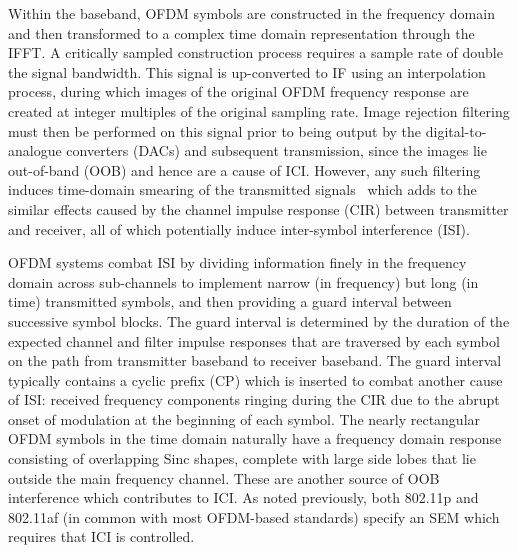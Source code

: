 Within the baseband, OFDM symbols are constructed in the frequency domain and then transformed to a complex time domain representation through the IFFT.
A critically sampled construction process requires a sample rate of double the signal bandwidth.
This signal is up-converted to IF using an interpolation process, during which images of the original OFDM frequency response are created at integer multiples of the original sampling rate.
Image rejection filtering must then be performed on this signal prior to being output by the digital-to-analogue converters (DACs) and subsequent transmission, since the images lie out-of-band (OOB) and hence are a cause of ICI.
However, any such filtering induces time-domain smearing of the transmitted signals~\cite{Faulkner2000} which adds to the similar effects caused by the channel impulse response (CIR) between transmitter and receiver, all of which potentially induce inter-symbol interference (ISI).

OFDM systems combat ISI by dividing information finely in the frequency domain across sub-channels to implement narrow (in frequency) but long (in time) transmitted symbols, and then providing a guard interval between successive symbol blocks.
The guard interval is determined by the duration of the expected channel and filter impulse responses that are traversed by each symbol on the path from transmitter baseband to receiver baseband.
The guard interval typically contains a cyclic prefix (CP) which is inserted to combat another cause of ISI: received frequency components ringing during the CIR due to the abrupt onset of modulation at the beginning of each symbol.
%
The nearly rectangular OFDM symbols in the time domain naturally have a frequency domain response consisting of overlapping Sinc shapes, complete with large side lobes that lie outside the main frequency channel.
These are another source of OOB interference which contributes to ICI.
As noted previously, both 802.11p and 802.11af (in common with most OFDM-based standards) specify an SEM which requires that ICI is controlled.

